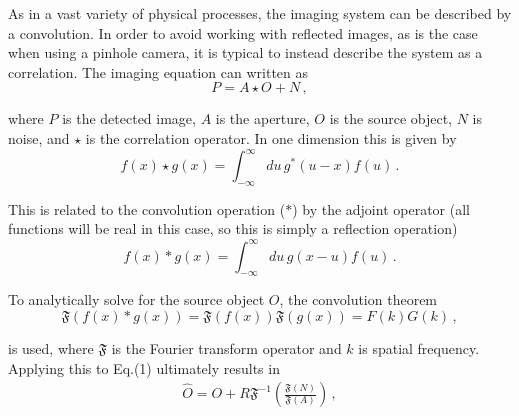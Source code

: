 \documentclass[10pt]{article}
\begin{document}
As in a vast variety of physical processes, the imaging system can be described by a convolution. In order to avoid working with reflected images, as is the case when using a pinhole camera, it is typical to instead describe the system as a correlation. The imaging equation can written as
%
%
\begin{equation}
	P = A \star O + N\,,
\end{equation}

\noindent where $P$ is the detected image, $A$ is the aperture, $O$ is the source object, $N$ is noise, and $\star$ is the correlation operator. In one dimension this is given by
%
\begin{equation}
	f(x) \star g(x) = \int_{-\infty}^\infty du\,g^\ast(u-x)f(u)\,.
\end{equation}

\noindent This is related to the convolution operation ($\ast$) by the adjoint operator (all functions will be real in this case, so this is simply a reflection operation)
%
\begin{equation}
	f(x) \ast g(x) = \int_{-\infty}^\infty du\,g(x-u)f(u)\,.
\end{equation}

\noindent To analytically solve for the source object $O$, the convolution theorem
%
\begin{equation}
	\mathfrak{F}(f(x) \ast g(x)) = \mathfrak{F}(f(x)) \mathfrak{F}(g(x)) = F(k)G(k)\,,
\end{equation}

\noindent is used, where $\mathfrak{F}$ is the Fourier transform operator and $k$ is spatial frequency. Applying this to Eq.(1) ultimately results in 
%
\begin{align}
	\hat{O} = O + R\mathfrak{F}^{-1}\left( \frac{\mathfrak{F}(N)}{\mathfrak{F}(A)}\right)\,,
\end{align}
\end{document}
